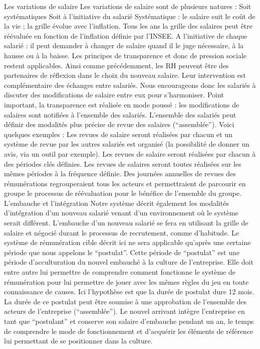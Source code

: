 \documentclass[12pt]{article}
\begin{document}
 Les variations de salaire
 Les variations de salaire sont de plusieurs natures : 
 Soit systématiques
 Soit à l’initiative du salarié
 Systématique : le salaire suit le coût de la vie ; la grille évolue avec l’inflation.
 Tous les ans la grille des salaires peut être réévaluée en fonction de l’inflation définie par l’INSEE.
 A l'initiative de chaque salarié : il peut demander à changer de salaire quand il le juge nécessaire, à la hausse ou à la baisse.
 Les principes de transparence et donc de pression sociale restent applicables. Ainsi comme précédemment, les RH peuvent être des partenaires de réflexion dans le choix du nouveau salaire. Leur intervention est complémentaire des échanges entre salariés. Nous encourageons donc les salariés à discuter des modifications de salaire entre eux pour s’harmoniser. 
 Point important, la transparence est réalisée en mode poussé : les modifications de salaires sont notifiées à l’ensemble des salariés. 
 L’ensemble des salariés peut définir des modalités plus précise de revue des salaires (“assemblée”). Voici quelques exemples :
 Les revues de salaire seront réalisées par chacun et un système de revue par les autres salariés est organisé (la possibilité de donner un avis, via un outil par exemple).
 Les revues de salaire seront réalisées par chacun à des périodes clés définies. 
 Les revues de salaires seront toutes réalisées sur les mêmes périodes à la fréquence définie.
 Des journées annuelles de revues des rémunérations regrouperaient tous les acteurs et permettraient de parcourir en groupe le processus de réévaluation pour le bénéfice de l'ensemble du groupe.
 L’embauche et l’intégration
 Notre système décrit également les modalités d’intégration d’un nouveau salarié venant d’un environnement où le système serait différent.
 L’embauche d’un nouveau salarié se fera en utilisant la grille de salaire et négocié durant le processus de recrutement, comme d’habitude. 
 Le système de rémunération cible décrit ici ne sera applicable qu’après une certaine période que nous appelons le “postulat”. Cette période de “postulat” est une période d’acculturation du nouvel embauché à la culture de l’entreprise. Elle doit entre autre lui permettre de comprendre comment fonctionne le système de rémunération pour lui permettre de jouer avec les mêmes règles du jeu en toute connaissance de causes. Ici l’hypothèse est que la durée de postulat dure 12 mois. 
 La durée de ce postulat peut être soumise à une approbation de l’ensemble des acteurs de l’entreprise (“assemblée”).
 Le nouvel arrivant intègre l’entreprise en tant que “postulant” et conserve son salaire d’embauche pendant un an, le temps de comprendre le mode de fonctionnement et d’acquérir les éléments de référence lui permettant de se positionner dans la culture.  
\end{document}
